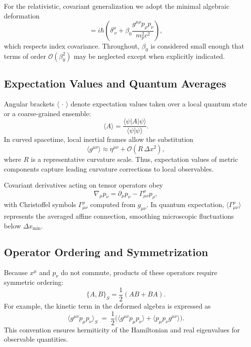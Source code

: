 \documentclass[11pt,oneside]{book}
\numberwithin{equation}{chapter}
\begin{document}
For the relativistic, covariant generalization we adopt the minimal algebraic deformation
\begin{equation}
[x^\mu,p_\nu]
= i\hbar\left(
  \delta^\mu_{\ \nu}
  + \beta_0 \frac{g^{\mu\rho}p_\rho p_\nu}{m_p^2 c^2}
\right),
\end{equation}
which respects index covariance.  
Throughout, $\beta_0$ is considered small enough that terms of order $\mathcal{O}(\beta_0^2)$ may be neglected except when explicitly indicated.

\subsection*{Expectation Values and Quantum Averages}

Angular brackets $\langle\,\cdot\,\rangle$ denote expectation values taken over a local quantum state or a coarse-grained ensemble:
\begin{equation}
\langle A \rangle = \frac{\langle \psi | A | \psi \rangle}{\langle \psi | \psi \rangle}.
\end{equation}
In curved spacetime, local inertial frames allow the substitution
\begin{equation}
\langle g^{\mu\nu}\rangle \approx \eta^{\mu\nu} + \mathcal{O}(R\,\Delta x^2),
\end{equation}
where $R$ is a representative curvature scale.  
Thus, expectation values of metric components capture leading curvature corrections to local observables.

Covariant derivatives acting on tensor operators obey
\begin{equation}
\nabla_\mu p_\nu = \partial_\mu p_\nu - \Gamma^\rho_{\mu\nu} p_\rho,
\end{equation}
with Christoffel symbols $\Gamma^\rho_{\mu\nu}$ computed from $g_{\mu\nu}$.  
In quantum expectation, $\langle \Gamma^\rho_{\mu\nu}\rangle$ represents the averaged affine connection, smoothing microscopic fluctuations below $\Delta x_{\min}$.

\subsection*{Operator Ordering and Symmetrization}

Because $x^\mu$ and $p_\nu$ do not commute, products of these operators require symmetric ordering:
\begin{equation}
\{A,B\}_S = \frac{1}{2}(AB + BA).
\end{equation}
For example, the kinetic term in the deformed algebra is expressed as
\begin{equation}
\langle g^{\mu\nu}p_\mu p_\nu\rangle_S
\;=\;
\frac{1}{2}\big(
  \langle g^{\mu\nu}p_\mu p_\nu\rangle
  + \langle p_\mu p_\nu g^{\mu\nu}\rangle
\big).
\end{equation}
This convention ensures hermiticity of the Hamiltonian and real eigenvalues for observable quantities.
\end{document}
